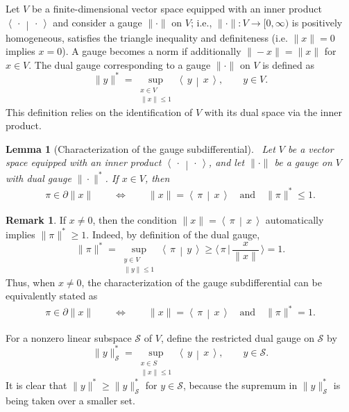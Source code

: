 \documentclass[12pt]{amsart}
\numberwithin{equation}{section}
\numberwithin{equation}{section}
\newtheorem{lemma}[thm]{Lemma}
\theoremstyle{definition}
\newtheorem{remark}[thm]{Remark}
\renewcommand{\SS}{\mathcal{S}}
\newcommand{\scalar}[2]{\left\langle\,#1\,\middle|\,#2\,\right\rangle}
\begin{document}
Let $V$ be a finite-dimensional vector space equipped with an inner product $\scalar{\cdot}{\cdot}$ and consider a gauge $\|\cdot\|$ on $V$; i.e., $\|\cdot\|\colon V\to[0,\infty)$ is positively homogeneous, satisfies the triangle inequality and definiteness (i.e. $\|x\|=0$ implies $x=0$). A gauge becomes a norm if additionally $\|-x\|=\|x\|$ for $x\in V$.  The dual gauge corresponding to a gauge $\|\cdot\|$ on $V$ is defined as
\[
\| y\|^\ast = \sup_{\substack{x\in V\\\|x\|\leq 1}}  \scalar{y}{x},\qquad y\in V. 
\]
This definition relies on the identification of $V$ with its dual space via the inner product.
\begin{lemma}[Characterization of the gauge subdifferential]\label{lem:subd}\ 
 Let $V$ be a vector space equipped with an inner product $\scalar{\cdot}{\cdot}$, and let $\|\cdot\|$ be a gauge on $V$ with dual gauge  $\|\cdot\|^\ast$. If $x\in V$, then 
    \begin{align*}
  \pi \in \partial\|x\|\qquad\iff\qquad     \|x\|=\scalar{\pi}{x} \quad
	\mbox{and}\quad \|\pi\|^\ast\leq 1.
    \end{align*}
\end{lemma}

\begin{remark}
If $x\neq0$, then the condition $\|x\|=\scalar{\pi}{x}$ automatically implies $\|\pi\|^\ast\geq 1$. Indeed, by definition of the dual gauge,
  \[
  \|\pi\|^\ast = \sup_{\substack{y\in V\\\|y\|\leq 1}}  \scalar{\pi}{y} \geq \langle \,\pi\, |\, \frac{x}{\|x\|}\,\rangle=1.  
  \]
  Thus, when $x\neq0$, the characterization of the gauge subdifferential can be equivalently stated as
  \begin{align*}
  \pi \in \partial\|x\|\qquad\iff\qquad     \|x\|=\scalar{\pi}{x} \quad
	\mbox{and}\quad \|\pi\|^\ast= 1.
    \end{align*}
\end{remark}

For a nonzero linear subspace $\SS$ of $V$, define the restricted dual gauge on $\SS$ by
\[
\|y\|_\SS^\ast = \sup_{\substack{x\in S\\\|x\|\leq 1}}  \scalar{y}{x},\qquad y\in \SS. 
\]
It is clear that
$\| y\|^\ast \geq \|y\|_\SS^\ast$ for $y\in \SS$,
because the supremum in $\|y\|_\SS^\ast$ is being taken over a smaller set. 
\end{document}
